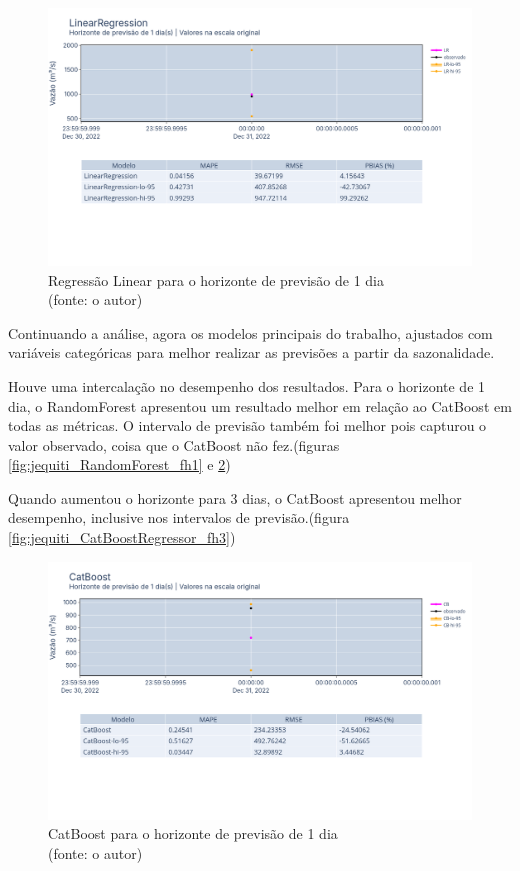 \begin{figure}[!h]
	\centering
	\includegraphics[scale=0.33]{Figuras/jequiti/resultados/LinearRegression_fh1.png}
	\caption{Regressão Linear para o horizonte de previsão de 1 dia\\(fonte: o autor)}
	\label{fig:jequiti_LinearRegression_fh1}
\end{figure}

Continuando a análise, agora os modelos principais do trabalho, ajustados com variáveis categóricas para melhor realizar as previsões a partir da sazonalidade.

Houve uma intercalação no desempenho dos resultados. Para o horizonte de 1 dia, o RandomForest apresentou um resultado melhor em relação ao CatBoost em todas as métricas. O intervalo de previsão também foi melhor pois capturou o valor observado, coisa que o CatBoost não fez.(figuras \ref{fig:jequiti_RandomForest_fh1} e \ref{fig:jequiti_CatBoostRegressor_fh1})

Quando aumentou o horizonte para 3 dias, o CatBoost apresentou melhor desempenho, inclusive nos intervalos de previsão.(figura \ref{fig:jequiti_CatBoostRegressor_fh3})

\begin{figure}[!h]
	\centering
	\includegraphics[scale=0.33]{Figuras/jequiti/resultados/CatBoost_fh1.png}
	\caption{CatBoost para o horizonte de previsão de 1 dia\\(fonte: o autor)}
	\label{fig:jequiti_CatBoostRegressor_fh1}
\end{figure}

